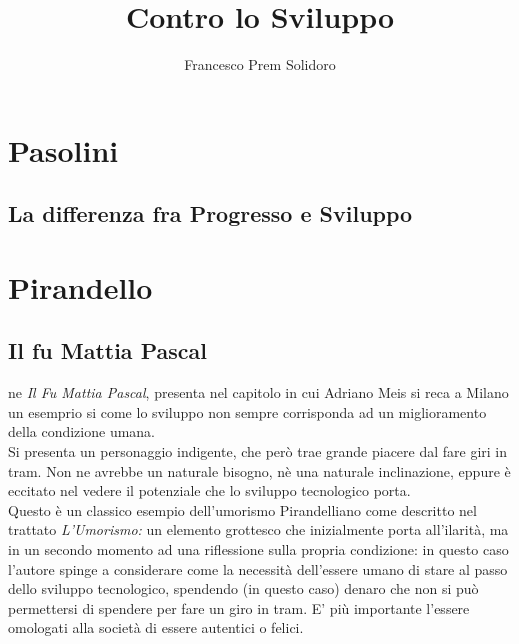 \documentclass{article}
\title{Contro lo Sviluppo}
\author{Francesco Prem Solidoro}
\begin{document}
\maketitle
\tableofcontents
\section{Pasolini} %
\label{sec:Pasolini}
\subsection{La differenza fra Progresso e Sviluppo} %
\label{sub:La differenza fra Progresso e Sviluppo}


\section{Pirandello} %


\label{sec:Pirandello}
\subsection{Il fu Mattia Pascal} %
\label{sub:Il fu Mattia Pascal}
ne \textit{Il Fu Mattia Pascal}, \textcite{il_fu_mattia_pascal} presenta nel capitolo in cui Adriano Meis si reca a Milano un
esemprio si come lo sviluppo non sempre corrisponda ad un miglioramento della condizione umana.\\
Si presenta un personaggio indigente, che però trae grande piacere dal fare giri in tram.
Non ne avrebbe un naturale bisogno, nè una naturale inclinazione, eppure è eccitato nel vedere il potenziale che 
lo sviluppo tecnologico porta.\\
Questo è un classico esempio dell'umorismo Pirandelliano come descritto nel trattato
\textit{L'Umorismo:}\cite{umorismo_pirandello} un elemento grottesco che inizialmente porta all'ilarità, ma in un secondo momento
ad una riflessione sulla propria condizione: in questo caso l'autore spinge a considerare come la necessità dell'essere umano di
stare al passo dello
sviluppo tecnologico, spendendo (in questo caso) denaro che non si può permettersi di spendere per fare un giro in tram.
E' più importante l'essere omologati alla società di essere autentici o felici.

\end{document}
